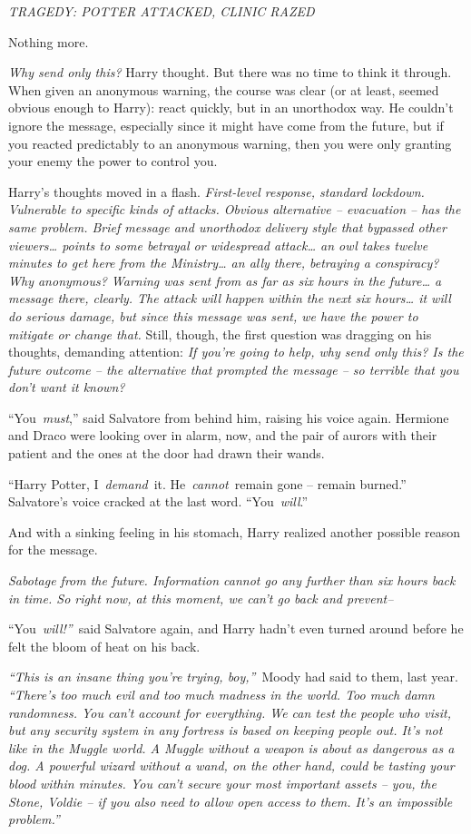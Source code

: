 \emph{TRAGEDY: POTTER ATTACKED, CLINIC RAZED}

Nothing more.

\emph{Why send only this?} Harry thought. But there was no time to think
it through. When given an anonymous warning, the course was clear (or at
least, seemed obvious enough to Harry): react quickly, but in an
unorthodox way. He couldn't ignore the message, especially since it
might have come from the future, but if you reacted predictably to an
anonymous warning, then you were only granting your enemy the power to
control you.

Harry's thoughts moved in a flash. \emph{First-level response, standard
lockdown. Vulnerable to specific kinds of attacks. Obvious alternative
-- evacuation -- has the same problem. Brief message and unorthodox
delivery style that bypassed other viewers\ldots{} points to some
betrayal or widespread attack\ldots{} an owl takes twelve minutes to get
here from the Ministry\ldots{} an ally there, betraying a conspiracy?
Why anonymous? Warning was sent from as far as six hours in the
future\ldots{} a message there, clearly. The attack will happen within
the next six hours\ldots{} it will do serious damage, but since this
message was sent, we have the power to mitigate or change that.} Still,
though, the first question was dragging on his thoughts, demanding
attention: \emph{If you're going to help, why send only this? Is the
future outcome -- the alternative that prompted the message -- so
terrible that you don't want it known?}

``You~\emph{must},'' said Salvatore from behind him, raising his voice
again. Hermione and Draco were looking over in alarm, now, and the pair
of aurors with their patient and the ones at the door had drawn their
wands.

``Harry Potter, I~\emph{demand}~it. He~\emph{cannot}~remain gone --
remain burned.'' Salvatore's voice cracked at the last word.
``You~\emph{will}.''

And with a sinking feeling in his stomach, Harry realized another
possible reason for the message.

\emph{Sabotage from the future. Information cannot go any further than
six hours back in time. So right now, at this moment, we can't go back
and prevent--}

``You~\emph{will!''}~said Salvatore again, and Harry hadn't even turned
around before he felt the bloom of heat on his back.

\emph{``This is an insane thing you're trying, boy,''}~Moody had said to
them, last year. \emph{``There's too much evil and too much madness in
the world. Too much damn randomness. You can't account for everything.
We can test the people who visit, but any security system in any
fortress is based on keeping people out. It's not like in the Muggle
world. A Muggle without a weapon is about as dangerous as a dog. A
powerful wizard without a wand, on the other hand, could be tasting your
blood within minutes. You can't secure your most important assets --
you, the Stone, Voldie -- if you also need to allow open access to them.
It's an impossible problem.''}

